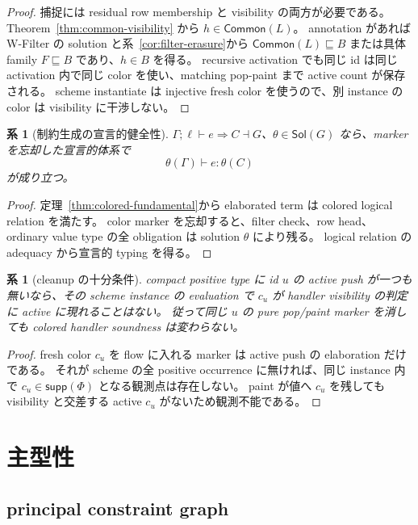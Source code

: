 \documentclass[uplatex,dvipdfmx,a4paper,10.5pt]{jsarticle}
\theoremstyle{jpplain}
\newtheorem{corollary}[definition]{系}
\newcommand{\Common}{\mathsf{Common}}
\newcommand{\sol}{\mathsf{Sol}}
\newcommand{\supp}{\mathsf{supp}}
\begin{document}
\begin{proof}
捕捉には residual row membership と visibility の両方が必要である。
Theorem~\ref{thm:common-visibility} から $h\in\Common(L)$。
annotation があれば W-Filter の solution と系~\ref{cor:filter-erasure}から $\Common(L)\sqsubseteq B$ または具体 family $F\sqsubseteq B$ であり、$h\in B$ を得る。
recursive activation でも同じ id は同じ activation 内で同じ color を使い、matching pop-paint まで active count が保存される。
scheme instantiate は injective fresh color を使うので、別 instance の color は visibility に干渉しない。
\end{proof}

\begin{corollary}[制約生成の宣言的健全性]\label{cor:declarative-soundness}
$\Gamma;\ell\vdash e\Rightarrow C\dashv G$、$\theta\in\sol(G)$ なら、marker を忘却した宣言的体系で
\[
  \theta(\Gamma)\vdash e:\theta(C)
\]
が成り立つ。
\end{corollary}

\begin{proof}
定理~\ref{thm:colored-fundamental}から elaborated term は colored logical relation を満たす。
color marker を忘却すると、filter check、row head、ordinary value type の全 obligation は solution $\theta$ により残る。
logical relation の adequacy から宣言的 typing を得る。
\end{proof}

\begin{corollary}[cleanup の十分条件]
compact positive type に id $u$ の active push が一つも無いなら、その scheme instance の evaluation で
$c_u$ が handler visibility の判定に active に現れることはない。
従って同じ $u$ の pure pop/paint marker を消しても colored handler soundness は変わらない。
\end{corollary}

\begin{proof}
fresh color $c_u$ を flow に入れる marker は active push の elaboration だけである。
それが scheme の全 positive occurrence に無ければ、同じ instance 内で $c_u\in\supp(\Phi)$ となる観測点は存在しない。
paint が値へ $c_u$ を残しても visibility と交差する active $c_u$ がないため観測不能である。
\end{proof}


\section{主型性}

\subsection{principal constraint graph}
\end{document}
